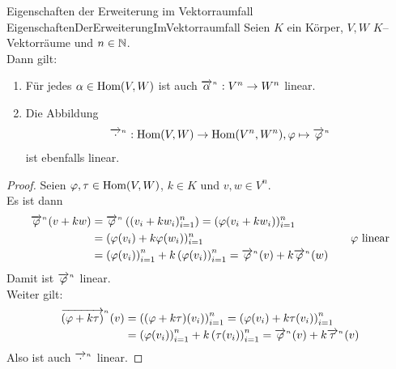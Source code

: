 \begin{lemma}{Eigenschaften der Erweiterung im Vektorraumfall}
             {EigenschaftenDerErweiterungImVektorraumfall}
Seien $K$ ein Körper, $V,W$ $K$--Vektorräume und $n \in \mathbb{N}$.\\
Dann gilt:
\begin{enumerate}[(1)]
	\item \label{EigenschaftenDerErweiterungImVektorraumfall1}
	 Für jedes $\alpha \in \mathop{\textrm{Hom}}\nolimits(V, W)$ ist auch 
    ${\overrightarrow{\alpha}}^{{}_n}:V^n \rightarrow W^n$ linear.
\item \label{EigenschaftenDerErweiterungImVektorraumfall2} Die Abbildung \[
{\overrightarrow{\cdot}}^{{}_n}: \mathop{\textrm{Hom}}\nolimits(V, W) \rightarrow \mathop{\textrm{Hom}}\nolimits(V^n, W^n), \varphi\mapsto{\overrightarrow{\varphi}}^{{}_n}\]
ist ebenfalls linear.
\end{enumerate}
\end{lemma}
\begin{proof}
Seien $\varphi, \tau \in \mathop{\textrm{Hom}}\nolimits(V, W)$, $k \in K$ und $v, w \in V^n$.\\
Es ist dann
\begin{align*}
{\overrightarrow{\varphi}}^{{}_n}(v+kw)
   & = {\overrightarrow{\varphi}}^{{}_n} \left((v_i+k w_i)_{i=1}^n\right)
     = (\varphi(v_i+kw_i))_{i=1}^n\\
   & = (\varphi(v_i) + k \varphi(w_i))_{i=1}^n &\quad \varphi \text{ linear}\\
   & = \left(\varphi(v_i)\right)_{i=1}^n + k\left(\varphi(v_i)\right)_{i=1}^n
     = {\overrightarrow{\varphi}}^{{}_n} (v) + k {\overrightarrow{\varphi}}^{{}_n} (w)
\end{align*}
Damit ist ${\overrightarrow{\varphi}}^{{}_n}$ linear.\\
Weiter gilt:
\begin{align*}
{\overrightarrow{(\varphi + k \tau)}}^{{}_n} (v)
  & = \left((\varphi + k \tau)(v_i)\right)_{i=1}^n
    = \left(\varphi(v_i) + k \tau(v_i)\right)_{i=1}^n\\
  & = \left(\varphi(v_i)\right)_{i=1}^n + k \left(\tau(v_i)\right)_{i=1}^n
    = {\overrightarrow{\varphi}}^{{}_n} (v) + k {\overrightarrow{\tau}}^{{}_n} (v)
\end{align*}
Also ist auch ${\overrightarrow{\cdot}}^{{}_n}$ linear.
\end{proof}
